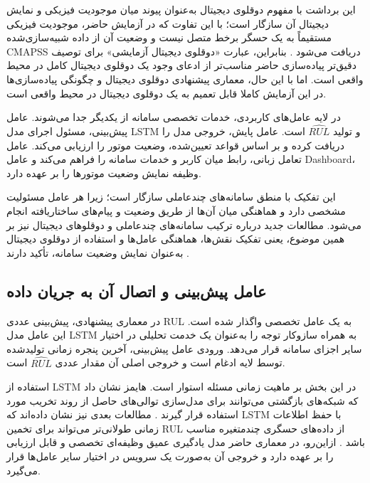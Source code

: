 این برداشت با مفهوم دوقلوی دیجیتال به‌عنوان پیوند میان موجودیت
فیزیکی و نمایش دیجیتال آن سازگار است؛ با این تفاوت که در آزمایش
حاضر، موجودیت فیزیکی مستقیماً به یک حسگر برخط متصل نیست و وضعیت
آن از داده شبیه‌سازی‌شده \gls{CMAPSS} دریافت می‌شود
\cite{tao2018digital,qi2021enabling}. بنابراین، عبارت «دوقلوی دیجیتال
آزمایشی» برای توصیف دقیق‌تر پیاده‌سازی حاضر مناسب‌تر از ادعای
وجود یک دوقلوی دیجیتال کامل در محیط واقعی است. اما با این حال، معماری پیشنهادی دوقلوی دیجیتال و چگونگی پیاده‌سازی‌ها در این آزمایش کاملا قابل تعمیم به یک دوقلوی دیجیتال در محیط واقعی است.

در لایه عامل‌های کاربردی، خدمات تخصصی سامانه از یکدیگر جدا
می‌شوند. عامل پیش‌بینی، مسئول اجرای مدل \gls{LSTM} و تولید
$\widehat{RUL}$ است. عامل پایش، خروجی مدل را دریافت کرده و بر اساس
قواعد تعیین‌شده، وضعیت موتور را ارزیابی می‌کند. عامل تعامل زبانی،
رابط میان کاربر و خدمات سامانه را فراهم می‌کند و عامل 
\gls{Dashboard}،
وظیفه نمایش وضعیت موتورها را بر عهده دارد.

این تفکیک با منطق سامانه‌های چندعاملی سازگار است؛ زیرا هر عامل
مسئولیت مشخصی دارد و هماهنگی میان آن‌ها از طریق وضعیت و پیام‌های
ساختاریافته انجام می‌شود. مطالعات جدید درباره ترکیب سامانه‌های
چندعاملی و دوقلوهای دیجیتال نیز بر همین موضوع، یعنی تفکیک نقش‌ها،
هماهنگی عامل‌ها و استفاده از دوقلوی دیجیتال به‌عنوان نمایش وضعیت سامانه،
تأکید دارند \cite{lopez2024madtwin,pretel2022masdt}.

\subsection{عامل پیش‌بینی و اتصال آن به جریان داده}
\label{sec:cmapss-prediction-agent}

در معماری پیشنهادی، پیش‌بینی عددی \gls{RUL} به یک عامل تخصصی
واگذار شده است. این عامل مدل \gls{LSTM} به همراه سازوکار توجه را
به‌عنوان یک خدمت تحلیلی در اختیار سایر اجزای سامانه قرار می‌دهد.
ورودی عامل پیش‌بینی، آخرین پنجره زمانی تولیدشده توسط لایه ادغام
است و خروجی اصلی آن مقدار عددی $\widehat{RUL}$ است.

استفاده از \gls{LSTM} در این بخش بر ماهیت زمانی مسئله استوار است.
هایمز نشان داد که شبکه‌های بازگشتی می‌توانند برای مدل‌سازی
توالی‌های حاصل از روند تخریب مورد استفاده قرار گیرند
\cite{heimes2008recurrent}.
 مطالعات بعدی نیز نشان داده‌اند که LSTM با
حفظ اطلاعات زمانی طولانی‌تر می‌تواند برای تخمین \gls{RUL} از
داده‌های حسگری چندمتغیره مناسب باشد \cite{heimes2008recurrent}.
ازاین‌رو، در معماری حاضر مدل یادگیری عمیق وظیفه‌ای تخصصی و
قابل ارزیابی را بر عهده دارد و خروجی آن به‌صورت یک سرویس در
اختیار سایر عامل‌ها قرار می‌گیرد.

